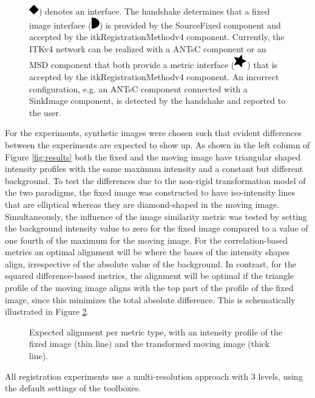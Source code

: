 \begin{figure}[tb!]
{\protect\includegraphics[height=1.2ex]{IFsquare.pdf}) denotes an interface. The handshake determines that a fixed image interface (\protect\includegraphics[height=1.2ex]{IFmoon.pdf}) is provided by the SourceFixed component and accepted by the itkRegistrationMethodv4 component.
Currently, the ITKv4 network can be realized with a ANTsC component or an MSD component that both provide a metric interface (\protect\includegraphics[height=1.2ex]{IFstar.pdf}) that is accepted by the itkRegistrationMethodv4 component. An incorrect configuration, e.g. an ANTsC component connected with a SinkImage component, is detected by the handshake and reported to the user.
}\label{fig:networks}
\end{figure}

For the experiments, synthetic images were chosen such that evident 
differences between the experiments are expected to show up. As 
shown in the left column of Figure \ref{fig:results} both the 
fixed and the moving image have triangular shaped intensity profiles 
with the same maximum intensity and a constant 
but different background. To test the differences due to the 
non-rigid transformation model of the two paradigms, the fixed image 
was constructed to have iso-intensity lines that are elliptical 
whereas they are diamond-shaped in the moving image. Simultaneously, 
the influence of the image similarity metric was tested by setting 
the background intensity value to zero for the fixed image compared 
to a value of one fourth of the maximum for the moving image. For the correlation-based metrics 
an optimal alignment will be where the bases of the intensity shapes 
align, irrespective of the absolute value of the background. In 
contrast, for the squared difference-based metrics, the alignment 
will be optimal if the triangle profile of the moving image aligns 
with the top part of the profile of the fixed image, since this 
minimizes the total absolute difference. 
This is schematically illustrated in Figure \ref{fig:synth_alignment}.
\begin{figure}[!tb]
\centering

\caption{Expected alignment per metric type, with an intensity profile of the fixed image (thin line) and the transformed moving image (thick line).}\label{fig:synth_alignment}
\end{figure}
All registration 
experiments use a multi-resolution approach with 3 levels, using the 
default settings of the toolboxes.

